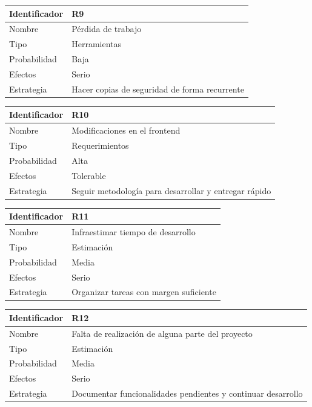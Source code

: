 \vspace{1em}
\par
\begin{tabular}{||p{3cm}|p{11cm}||} 
\hline
Identificador & R9 \\ [0.5ex] 
\hline\hline
Nombre & Pérdida de trabajo \\ 
\hline
Tipo & Herramientas \\
\hline
Probabilidad & Baja \\
\hline
Efectos & Serio \\
\hline
Estrategia & Hacer copias de seguridad de forma recurrente \\ [1ex] 
\hline
\end{tabular}

\vspace{1em}
\par
\begin{tabular}{||p{3cm}|p{11cm}||} 
\hline
Identificador & R10 \\ [0.5ex] 
\hline\hline
Nombre & Modificaciones en el frontend \\ 
\hline
Tipo & Requerimientos \\
\hline
Probabilidad & Alta \\
\hline
Efectos & Tolerable \\
\hline
Estrategia & Seguir metodología para desarrollar y entregar rápido \\ [1ex] 
\hline
\end{tabular}

\vspace{1em}
\par
\begin{tabular}{||p{3cm}|p{11cm}||} 
\hline
Identificador & R11 \\ [0.5ex] 
\hline\hline
Nombre & Infraestimar tiempo de desarrollo \\ 
\hline
Tipo & Estimación \\
\hline
Probabilidad & Media \\
\hline
Efectos & Serio \\
\hline
Estrategia & Organizar tareas con margen suficiente \\ [1ex] 
\hline
\end{tabular}

\vspace{1em}
\par
\begin{tabular}{||p{3cm}|p{11cm}||} 
\hline
Identificador & R12 \\ [0.5ex] 
\hline\hline
Nombre & Falta de realización de alguna parte del proyecto \\ 
\hline
Tipo & Estimación \\
\hline
Probabilidad & Media \\
\hline
Efectos & Serio \\
\hline
Estrategia & Documentar funcionalidades pendientes y continuar desarrollo \\ [1ex] 
\hline
\end{tabular}

